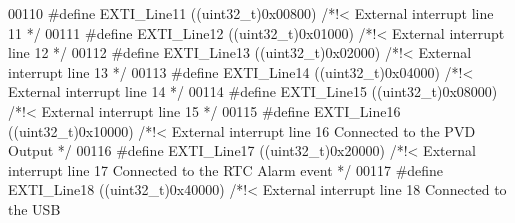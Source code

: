 \begin{DoxyCode}
00110 \textcolor{preprocessor}{#}\textcolor{preprocessor}{define} \textcolor{preprocessor}{EXTI\_Line11}      \textcolor{preprocessor}{(}\textcolor{preprocessor}{(}\textcolor{preprocessor}{uint32\_t}\textcolor{preprocessor}{)}0x00800\textcolor{preprocessor}{)}     \textcolor{comment}{/*!< External interrupt line 11 */}
00111 \textcolor{preprocessor}{#}\textcolor{preprocessor}{define} \textcolor{preprocessor}{EXTI\_Line12}      \textcolor{preprocessor}{(}\textcolor{preprocessor}{(}\textcolor{preprocessor}{uint32\_t}\textcolor{preprocessor}{)}0x01000\textcolor{preprocessor}{)}     \textcolor{comment}{/*!< External interrupt line 12 */}
00112 \textcolor{preprocessor}{#}\textcolor{preprocessor}{define} \textcolor{preprocessor}{EXTI\_Line13}      \textcolor{preprocessor}{(}\textcolor{preprocessor}{(}\textcolor{preprocessor}{uint32\_t}\textcolor{preprocessor}{)}0x02000\textcolor{preprocessor}{)}     \textcolor{comment}{/*!< External interrupt line 13 */}
00113 \textcolor{preprocessor}{#}\textcolor{preprocessor}{define} \textcolor{preprocessor}{EXTI\_Line14}      \textcolor{preprocessor}{(}\textcolor{preprocessor}{(}\textcolor{preprocessor}{uint32\_t}\textcolor{preprocessor}{)}0x04000\textcolor{preprocessor}{)}     \textcolor{comment}{/*!< External interrupt line 14 */}
00114 \textcolor{preprocessor}{#}\textcolor{preprocessor}{define} \textcolor{preprocessor}{EXTI\_Line15}      \textcolor{preprocessor}{(}\textcolor{preprocessor}{(}\textcolor{preprocessor}{uint32\_t}\textcolor{preprocessor}{)}0x08000\textcolor{preprocessor}{)}     \textcolor{comment}{/*!< External interrupt line 15 */}
00115 \textcolor{preprocessor}{#}\textcolor{preprocessor}{define} \textcolor{preprocessor}{EXTI\_Line16}      \textcolor{preprocessor}{(}\textcolor{preprocessor}{(}\textcolor{preprocessor}{uint32\_t}\textcolor{preprocessor}{)}0x10000\textcolor{preprocessor}{)}     \textcolor{comment}{/*!< External interrupt line 16 Connected to the PVD
       Output */}
00116 \textcolor{preprocessor}{#}\textcolor{preprocessor}{define} \textcolor{preprocessor}{EXTI\_Line17}      \textcolor{preprocessor}{(}\textcolor{preprocessor}{(}\textcolor{preprocessor}{uint32\_t}\textcolor{preprocessor}{)}0x20000\textcolor{preprocessor}{)}     \textcolor{comment}{/*!< External interrupt line 17 Connected to the RTC
       Alarm event */}
00117 \textcolor{preprocessor}{#}\textcolor{preprocessor}{define} \textcolor{preprocessor}{EXTI\_Line18}      \textcolor{preprocessor}{(}\textcolor{preprocessor}{(}\textcolor{preprocessor}{uint32\_t}\textcolor{preprocessor}{)}0x40000\textcolor{preprocessor}{)}     \textcolor{comment}{/*!< External interrupt line 18 Connected to the USB
}
\end{DoxyCode}
